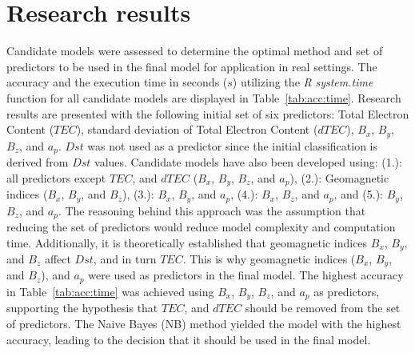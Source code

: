 \let\LaTeXcline\cline\documentclass[sn-mathphys-num]{sn-jnl}\let\cline\LaTeXcline
\begin{document}
\section{Research results}
\label{sec:Results}

Candidate models were assessed to determine the optimal method and set of predictors to be used in the final model for application in real settings. The accuracy and the execution time in seconds ($s$) utilizing the \textit{R} \textit{system.time} function for all candidate models are displayed in Table~\ref{tab:acc:time}. Research results are presented with the following initial set of six predictors: Total Electron Content ($TEC$), standard deviation of Total Electron Content ($dTEC$), $B_{x}$, $B_{y}$, $B_{z}$, and $a_{p}$. $Dst$ was not used as a predictor since the initial classification is derived from $Dst$ values. Candidate models have also been developed using: (1.): all predictors except $TEC$, and $dTEC$ ($B_{x}$, $B_{y}$, $B_{z}$, and $a_{p}$), (2.): Geomagnetic indices ($B_{x}$, $B_{y}$, and $B_{z}$), (3.): $B_{x}$, $B_{y}$, and $a_{p}$, (4.): $B_{x}$, $B_{z}$, and $a_{p}$, and (5.): $B_{y}$, $B_{z}$, and $a_{p}$. The reasoning behind this approach was the assumption that reducing the set of predictors would reduce model complexity and computation time. Additionally, it is theoretically established that geomagnetic indices $B_{x}$, $B_{y}$, and $B_{z}$ affect $Dst$, and in turn $TEC$. This is why geomagnetic indices ($B_{x}$, $B_{y}$, and $B_{z}$), and $a_{p}$ were used as predictors in the final model. The highest accuracy in Table~\ref{tab:acc:time} was achieved using $B_{x}$, $B_{y}$, $B_{z}$, and $a_{p}$ as predictors, supporting the hypothesis that $TEC$, and $dTEC$ should be removed from the set of predictors. The Naive Bayes (NB) method yielded the model with the highest accuracy, leading to the decision that it should be used in the final model.
\end{document}
